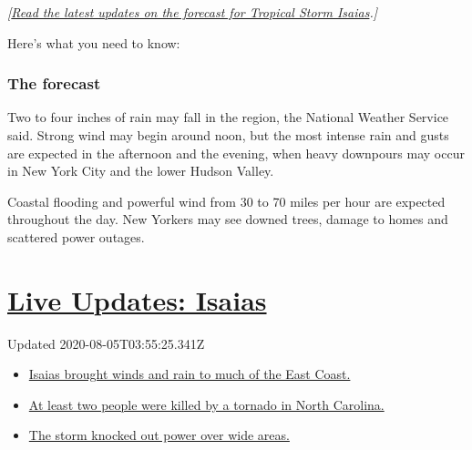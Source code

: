 \emph{{[}}\href{https://www.nytimes3xbfgragh.onion/2020/08/03/us/isaias-storm-updates.html}{\emph{Read
the latest updates on the forecast for Tropical Storm
Isaias}}\emph{.{]}}

Here's what you need to know:

\hypertarget{the-forecast}{%
\subsubsection{The forecast}\label{the-forecast}}

Two to four inches of rain may fall in the region, the National Weather
Service said. Strong wind may begin around noon, but the most intense
rain and gusts are expected in the afternoon and the evening, when heavy
downpours may occur in New York City and the lower Hudson Valley.

Coastal flooding and powerful wind from 30 to 70 miles per hour are
expected throughout the day. New Yorkers may see downed trees, damage to
homes and scattered power outages.

\hypertarget{live-updates-isaias}{%
\section{\texorpdfstring{\href{https://www.nytimes3xbfgragh.onion/2020/08/04/us/isaias-storm-updates.html?action=click\&pgtype=Article\&state=default\&region=MAIN_CONTENT_1\&context=storylines_live_updates}{Live
Updates: Isaias}}{Live Updates: Isaias}}\label{live-updates-isaias}}

Updated 2020-08-05T03:55:25.341Z

\begin{itemize}
\tightlist
\item
  \href{https://www.nytimes3xbfgragh.onion/2020/08/04/us/isaias-storm-updates.html?action=click\&pgtype=Article\&state=default\&region=MAIN_CONTENT_1\&context=storylines_live_updates\#link-38d68049}{Isaias
  brought winds and rain to much of the East Coast.}
\item
  \href{https://www.nytimes3xbfgragh.onion/2020/08/04/us/isaias-storm-updates.html?action=click\&pgtype=Article\&state=default\&region=MAIN_CONTENT_1\&context=storylines_live_updates\#link-7961bdbc}{At
  least two people were killed by a tornado in North Carolina.}
\item
  \href{https://www.nytimes3xbfgragh.onion/2020/08/04/us/isaias-storm-updates.html?action=click\&pgtype=Article\&state=default\&region=MAIN_CONTENT_1\&context=storylines_live_updates\#link-3480f4a1}{The
  storm knocked out power over wide areas.}
\end{itemize}

